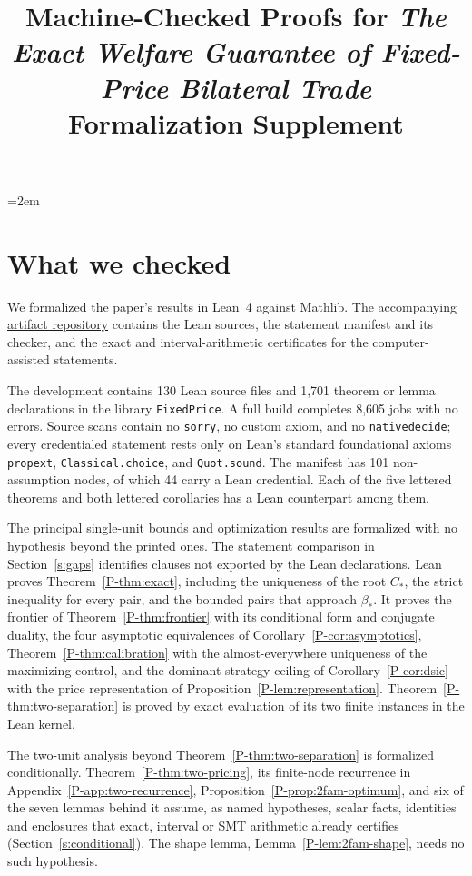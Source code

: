 \documentclass[11pt]{article}
\title{Machine-Checked Proofs for \emph{The Exact Welfare Guarantee of Fixed-Price Bilateral Trade}\\
\large Formalization Supplement}
\author{}
\date{}
\newcommand{\pref}[1]{\ref*{P-#1}}
\newcommand{\lean}[1]{\begingroup\def\_{\textunderscore\allowbreak}\texttt{\small #1}\endgroup}
\newcommand{\artifactlink}{\href{https://github.com/lintingyee-del/fixed-price-bilateral-trade}{artifact repository}}
\begin{document}
\emergencystretch=2em
\maketitle

\section{What we checked}

We formalized the paper's results in Lean~4 against Mathlib. The
accompanying \artifactlink{} contains the Lean sources, the statement
manifest and its checker, and the exact and interval-arithmetic
certificates for the computer-assisted statements.

The development contains 130 Lean source files and 1,701 theorem or lemma
declarations in the library \lean{FixedPrice}. A full build completes 8,605
jobs with no errors. Source scans contain no \lean{sorry}, no custom axiom,
and no \lean{native\_decide}; every credentialed statement rests only on
Lean's standard foundational axioms \lean{propext}, \lean{Classical.choice},
and \lean{Quot.sound}. The manifest has 101 non-assumption nodes, of which
44 carry a Lean credential. Each of the five lettered theorems and both
lettered corollaries has a Lean counterpart among them.

The principal single-unit bounds and optimization results are
formalized with no hypothesis beyond the printed ones. The statement
comparison in Section~\ref{s:gaps} identifies clauses not exported by
the Lean declarations. Lean proves Theorem~\pref{thm:exact}, including the
uniqueness of the root $C_*$, the strict inequality for every pair, and
the bounded pairs that approach $\beta_*$. It proves the frontier of
Theorem~\pref{thm:frontier} with its conditional form and conjugate
duality, the four asymptotic equivalences of
Corollary~\pref{cor:asymptotics}, Theorem~\pref{thm:calibration} with the
almost-everywhere uniqueness of the maximizing control, and the
dominant-strategy ceiling of Corollary~\pref{cor:dsic} with the price
representation of Proposition~\pref{lem:representation}.
Theorem~\pref{thm:two-separation} is proved by exact evaluation of its two
finite instances in the Lean kernel.

The two-unit analysis beyond Theorem~\pref{thm:two-separation} is
formalized conditionally. Theorem~\pref{thm:two-pricing}, its finite-node
recurrence in Appendix~\pref{app:two-recurrence},
Proposition~\pref{prop:2fam-optimum}, and six of the seven lemmas behind it
assume, as named hypotheses, scalar facts, identities and enclosures that
exact, interval or SMT arithmetic already certifies
(Section~\ref{s:conditional}). The shape lemma,
Lemma~\pref{lem:2fam-shape}, needs no such hypothesis.
\end{document}
